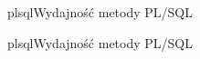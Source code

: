 






\begin{qxtab}{plsql}{Wydajność metody PL/SQL}
\end{qxtab}

\begin{qxfig}{plsql}{Wydajność metody PL/SQL}
\end{qxfig}








